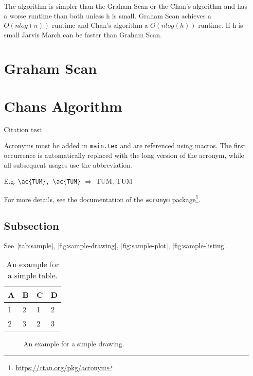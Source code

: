 The algorithm is simpler than the Graham Scan or the Chan's algorithm and has a worse
runtime than both unless h is small. Graham Scan achieves a $O(n log(n))$ runtime and 
Chan's algorithm a $O(n log(h))$ runtime. If h is small Jarvis March 
can be faster than Graham Scan.


\section{Graham Scan}

\section{Chans Algorithm}


Citation test~\parencite{latex}.

Acronyms must be added in \texttt{main.tex} and are referenced using macros. The first occurrence is automatically replaced with the long version of the acronym, while all subsequent usages use the abbreviation.

E.g. \texttt{\textbackslash ac\{TUM\}, \textbackslash ac\{TUM\}} $\Rightarrow$ \ac{TUM}, \ac{TUM}

For more details, see the documentation of the \texttt{acronym} package\footnote{\url{https://ctan.org/pkg/acronym}}.
\subsection{Subsection}

See~\autoref{tab:sample}, \autoref{fig:sample-drawing}, \autoref{fig:sample-plot}, \autoref{fig:sample-listing}.

\begin{table}[htpb]
  \caption[Example table]{An example for a simple table.}\label{tab:sample}
  \centering
  \begin{tabular}{l l l l}
    \toprule
      A & B & C & D \\
    \midrule
      1 & 2 & 1 & 2 \\
      2 & 3 & 2 & 3 \\
    \bottomrule
  \end{tabular}
\end{table}

\begin{figure}[htpb]
  \centering
  \caption[Example drawing]{An example for a simple drawing.}\label{fig:sample-drawing}
\end{figure}

